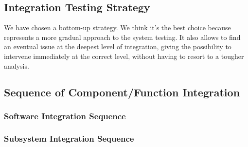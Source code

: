 	\subsection{Integration Testing Strategy}
	We have chosen a bottom-up strategy. We think it's the best choice because represents a more gradual
	approach to the system testing. It also allows to find an eventual issue at the deepest level of
	integration, giving the possibility to intervene immediately at the correct level, without having to
	resort to a tougher analysis.
	\subsection{Sequence of Component/Function Integration}
		\subsubsection{Software Integration Sequence}
		\subsubsection{Subsystem Integration Sequence}